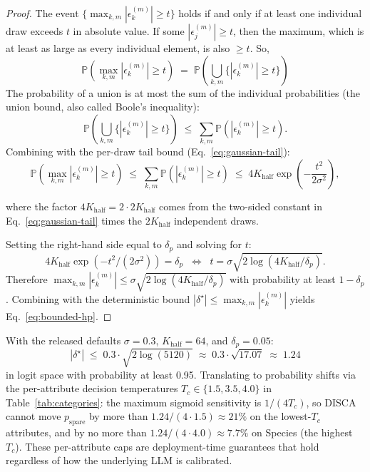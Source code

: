 \documentclass{article}
\begin{document}
\begin{proof}
The event $\{\max_{k,m}|\epsilon_k^{(m)}| \geq t\}$ holds if and only if at least one individual draw exceeds $t$ in absolute value. If some $|\epsilon_j^{(m)}| \geq t$, then the maximum, which is at least as large as every individual element, is also $\geq t$. So,
\begin{equation*}
\mathbb{P}\left(\max_{k,m} |\epsilon_k^{(m)}| \geq t\right) \;=\; \mathbb{P}\!\left(\bigcup_{k,m} \{|\epsilon_k^{(m)}| \geq t\}\right) 
\end{equation*}
The probability of a union is at most the sum of the individual probabilities (the union bound, also called Boole's inequality):
\begin{equation*}
\mathbb{P}\!\left(\bigcup_{k,m} \{|\epsilon_k^{(m)}| \geq t\}\right) 
\;\leq\; \sum_{k,m} \mathbb{P}(|\epsilon_k^{(m)}| \geq t).
\end{equation*}
Combining with the per-draw tail bound (Eq.~\ref{eq:gaussian-tail}):
\begin{equation*}
\mathbb{P}\!\left(\max_{k,m} |\epsilon_k^{(m)}| \geq t\right) 
\;\leq\; \sum_{k,m} \mathbb{P}(|\epsilon_k^{(m)}| \geq t) 
\;\leq\; 4 K_{\text{half}} \exp\!\left(-\frac{t^2}{2\sigma^2}\right),
\end{equation*}

where the factor $4K_{\text{half}} = 2 \cdot 2K_{\text{half}}$ comes from the two-sided constant in Eq.~\ref{eq:gaussian-tail} times the $2K_{\text{half}}$ independent draws.


Setting the right-hand side equal to $\delta_p$ and solving for $t$:
\begin{equation*}
4K_{\text{half}} \exp(-t^2/(2\sigma^2)) = \delta_p 
\;\;\Longleftrightarrow\;\; 
t = \sigma\sqrt{2\log(4K_{\text{half}}/\delta_p)}.
\end{equation*}
Therefore $\max_{k,m}|\epsilon_k^{(m)}| \leq \sigma\sqrt{2\log(4K_{\text{half}}/\delta_p)}$ with probability at least $1 - \delta_p$. Combining with the deterministic bound $|\delta^\star| \leq \max_{k,m}|\epsilon_k^{(m)}|$ yields Eq.~\ref{eq:bounded-hp}. 
\end{proof}

With the released defaults $\sigma = 0.3$, $K_{\text{half}} = 64$, and $\delta_p = 0.05$:
\begin{equation*}
|\delta^\star| \;\leq\; 0.3 \cdot \sqrt{2\log(5120)} \;\approx\; 0.3 \cdot \sqrt{17.07} \;\approx\; 1.24
\end{equation*}
in logit space with probability at least 0.95. Translating to probability shifts via the per-attribute decision temperatures $T_c \in \{1.5, 3.5, 4.0\}$ in Table~\ref{tab:categories}: the maximum sigmoid sensitivity is $1/(4T_c)$, so DISCA cannot move $p_{\text{spare}}$ by more than $1.24/(4 \cdot 1.5) \approx 21\%$ on the lowest-$T_c$ attributes, and by no more than $1.24/(4 \cdot 4.0) \approx 7.7\%$ on Species (the highest $T_c$). These per-attribute caps are deployment-time guarantees that hold regardless of how the underlying LLM is calibrated.
\end{document}
